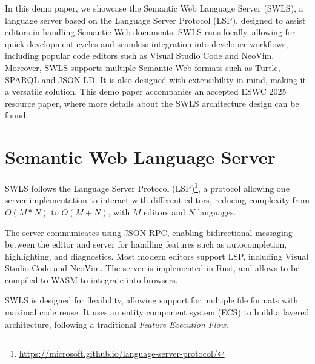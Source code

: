 In this demo paper, we showcase the Semantic Web Language Server (SWLS), a language server based on the Language Server Protocol (LSP), designed to assist editors in handling Semantic Web documents. 
SWLS runs locally, allowing for quick development cycles and seamless integration into developer workflows, including popular code editors such as Visual Studio Code and NeoVim. 
Moreover, SWLS supports multiple Semantic Web formats such as Turtle, SPARQL and JSON-LD.
It is also designed with extensibility in mind, making it a versatile solution. 
This demo paper accompanies an accepted ESWC 2025 resource paper, where more details about the SWLS architecture design can be found.

\section{Semantic Web Language Server}

SWLS follows the Language Server Protocol (LSP)\cite{IntroToLsp}\footnote{\url{https://microsoft.github.io/language-server-protocol/}},
a protocol allowing one server implementation to interact with different editors, reducing complexity from $O(M*N)$ to $O(M+N)$,
with $M$ editors and $N$ languages.

The server communicates using JSON-RPC, enabling bidirectional messaging between the editor and server for handling features such as autocompletion, highlighting, and diagnostics.
Most modern editors support LSP, including Visual Studio Code and NeoVim.
The server is implemented in Rust, and allows to be compiled to WASM to integrate into browsers.

SWLS is designed for flexibility, allowing support for multiple file formats with maximal code reuse. 
It uses an entity component system (ECS) to build a layered architecture\cite{10.1145/3550355.3552452}, following a traditional \textit{Feature Execution Flow}.

